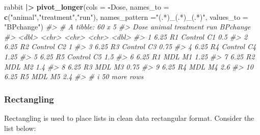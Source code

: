\documentclass[
]{book}
\newenvironment{Shaded}{\begin{snugshade}}{\end{snugshade}}
\newcommand{\AttributeTok}[1]{\textcolor[rgb]{0.13,0.29,0.53}{#1}}
\newcommand{\CommentTok}[1]{\textcolor[rgb]{0.56,0.35,0.01}{\textit{#1}}}
\newcommand{\FunctionTok}[1]{\textcolor[rgb]{0.13,0.29,0.53}{\textbf{#1}}}
\newcommand{\NormalTok}[1]{#1}
\newcommand{\SpecialCharTok}[1]{\textcolor[rgb]{0.81,0.36,0.00}{\textbf{#1}}}
\newcommand{\StringTok}[1]{\textcolor[rgb]{0.31,0.60,0.02}{#1}}
\begin{document}
\begin{Shaded}
\begin{Highlighting}[]
\NormalTok{rabbit }\SpecialCharTok{|\textgreater{}} 
  \FunctionTok{pivot\_longer}\NormalTok{(}\AttributeTok{cols =} \SpecialCharTok{{-}}\NormalTok{Dose,}
               \AttributeTok{names\_to =} \FunctionTok{c}\NormalTok{(}\StringTok{"animal"}\NormalTok{,}\StringTok{"treatment"}\NormalTok{,}\StringTok{"run"}\NormalTok{),}
               \AttributeTok{names\_pattern =}\StringTok{"(.*)\_(.*)\_(.*)"}\NormalTok{,}
               \AttributeTok{values\_to =} \StringTok{"BPchange"}\NormalTok{)}
\CommentTok{\#\textgreater{} \# A tibble: 60 x 5}
\CommentTok{\#\textgreater{}     Dose animal treatment run   BPchange}
\CommentTok{\#\textgreater{}    \textless{}dbl\textgreater{} \textless{}chr\textgreater{}  \textless{}chr\textgreater{}     \textless{}chr\textgreater{}    \textless{}dbl\textgreater{}}
\CommentTok{\#\textgreater{}  1  6.25 R1     Control   C1        0.5 }
\CommentTok{\#\textgreater{}  2  6.25 R2     Control   C2        1   }
\CommentTok{\#\textgreater{}  3  6.25 R3     Control   C3        0.75}
\CommentTok{\#\textgreater{}  4  6.25 R4     Control   C4        1.25}
\CommentTok{\#\textgreater{}  5  6.25 R5     Control   C5        1.5 }
\CommentTok{\#\textgreater{}  6  6.25 R1     MDL       M1        1.25}
\CommentTok{\#\textgreater{}  7  6.25 R2     MDL       M2        1.4 }
\CommentTok{\#\textgreater{}  8  6.25 R3     MDL       M3        0.75}
\CommentTok{\#\textgreater{}  9  6.25 R4     MDL       M4        2.6 }
\CommentTok{\#\textgreater{} 10  6.25 R5     MDL       M5        2.4 }
\CommentTok{\#\textgreater{} \# i 50 more rows}
\end{Highlighting}
\end{Shaded}

\subsubsection{Rectangling}\label{rectangling}

Rectangling is used to place lists in clean data rectangular format. Consider the list below:
\end{document}
